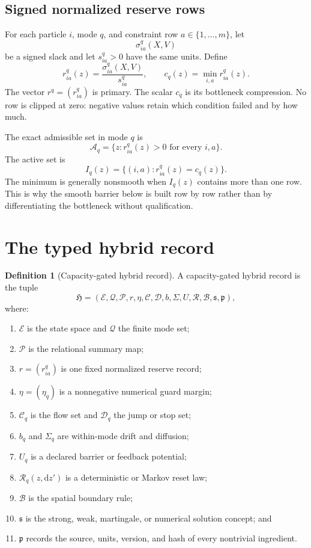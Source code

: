 \documentclass[11pt]{article}
\theoremstyle{definition}
\newtheorem{definition}[theorem]{Definition}
\theoremstyle{remark}
\newcommand{\cA}{\mathcal A}
\newcommand{\cB}{\mathcal B}
\newcommand{\cC}{\mathcal C}
\newcommand{\cD}{\mathcal D}
\newcommand{\cE}{\mathcal E}
\newcommand{\cP}{\mathcal P}
\newcommand{\cQ}{\mathcal Q}
\newcommand{\cR}{\mathcal R}
\newcommand{\dd}{\mathrm d}
\begin{document}
\subsection{Signed normalized reserve rows}

For each particle $i$, mode $q$, and constraint row $a\in\{1,\ldots,m\}$,
let
\[
 \sigma_{ia}^{q}(X,V)
\]
be a signed slack and let $s_{ia}^{q}>0$ have the same units.  Define
\[
 r_{ia}^{q}(z)=\frac{\sigma_{ia}^{q}(X,V)}{s_{ia}^{q}},
 \qquad
 c_q(z)=\min_{i,a}r_{ia}^{q}(z).
\]
The vector $r^q=(r_{ia}^q)$ is primary.  The scalar $c_q$ is its
bottleneck compression.  No row is clipped at zero: negative values retain
which condition failed and by how much.

The exact admissible set in mode $q$ is
\[
 \cA_q=\{z:r_{ia}^{q}(z)>0\text{ for every }i,a\}.
\]
The active set is
\[
 I_q(z)=\{(i,a):r_{ia}^{q}(z)=c_q(z)\}.
\]
The minimum is generally nonsmooth when $I_q(z)$ contains more than one
row.  This is why the smooth barrier below is built row by row rather than
by differentiating the bottleneck without qualification.

\section{The typed hybrid record}
\label{sec:record}

\begin{definition}[Capacity-gated hybrid record]
\label{def:record}
A capacity-gated hybrid record is the tuple
\[
\mathfrak H=
(\cE,\cQ,\cP,r,\eta,\cC,\cD,b,\Sigma,U,\cR,\cB,\mathfrak s,\mathfrak p),
\]
where:
\begin{enumerate}[leftmargin=2em]
\item $\cE$ is the state space and $\cQ$ the finite mode set;
\item $\cP$ is the relational summary map;
\item $r=(r_{ia}^{q})$ is one fixed normalized reserve record;
\item $\eta=(\eta_q)$ is a nonnegative numerical guard margin;
\item $\cC_q$ is the flow set and $\cD_q$ the jump or stop set;
\item $b_q$ and $\Sigma_q$ are within-mode drift and diffusion;
\item $U_q$ is a declared barrier or feedback potential;
\item $\cR_q(z,\dd z')$ is a deterministic or Markov reset law;
\item $\cB$ is the spatial boundary rule;
\item $\mathfrak s$ is the strong, weak, martingale, or numerical solution
      concept; and
\item $\mathfrak p$ records the source, units, version, and hash of every
      nontrivial ingredient.
\end{enumerate}
\end{definition}
\end{document}
